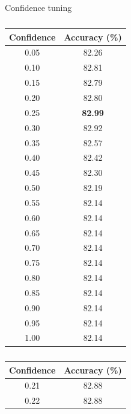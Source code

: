 \documentclass[12pt]{article}
\begin{document}
      \singlespacing
      \begin{table}[H]
          \caption{Confidence tuning}
          \begin{subtable}{.32\linewidth}
            \centering
            \caption{}
            \begin{tabular}{c|c}
              \toprule
              \multicolumn{1}{c|}{Confidence} & \multicolumn{1}{c}{Accuracy (\%)} \\
              \midrule
              0.05  & 82.26 \\
              0.10  & 82.81 \\
              0.15  & 82.79 \\
              0.20  & 82.80 \\
              0.25  & \textbf{82.99} \\
              0.30  & 82.92 \\
              0.35  & 82.57 \\
              0.40  & 82.42 \\
              0.45  & 82.30 \\
              0.50  & 82.19 \\
              0.55  & 82.14 \\
              0.60  & 82.14 \\
              0.65  & 82.14 \\
              0.70  & 82.14 \\
              0.75  & 82.14 \\
              0.80  & 82.14 \\
              0.85  & 82.14 \\
              0.90  & 82.14 \\
              0.95  & 82.14 \\
              1.00  & 82.14 \\
              \bottomrule
            \end{tabular}
            \label{tab:dt-con-a}
          \end{subtable}
          \begin{subtable}{.32\linewidth}
            \centering
            \caption{}
            \begin{tabular}{c|c}
              \toprule
              \multicolumn{1}{c|}{Confidence} & \multicolumn{1}{c}{Accuracy (\%)} \\
              \midrule
              0.21  & 82.88 \\
              0.22  & 82.88 \\

\end{tabular}
\end{subtable}
\end{table}
\end{document}
